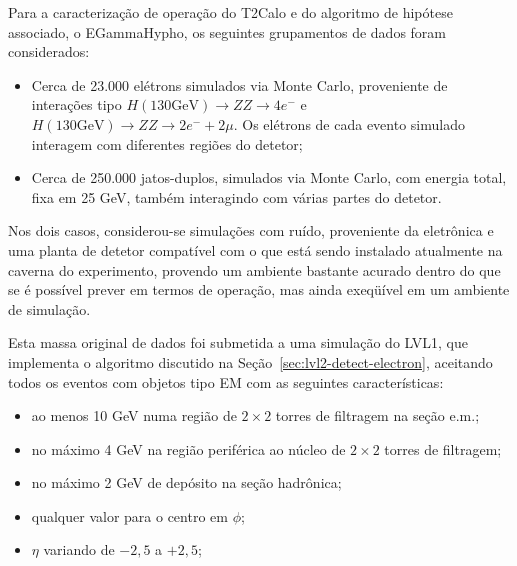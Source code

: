 Para a caracterização de operação do T2Calo e do algoritmo de hipótese
associado, o EGammaHypho, os seguintes grupamentos de dados foram
considerados:

\begin{itemize}
\item Cerca de 23.000 elétrons simulados via Monte Carlo, proveniente de
interações tipo $H (130 \text{GeV})\rightarrow ZZ \rightarrow 4e^-$ e 
$H (130 \text{GeV})\rightarrow ZZ \rightarrow 2e^- + 2\mu$. Os elétrons de
cada evento simulado interagem com diferentes regiões do detetor;
\item Cerca de 250.000 jatos-duplos, simulados via Monte Carlo, com energia total,
fixa em 25 GeV, também interagindo com várias partes do detetor.
\end{itemize}

Nos dois casos, considerou-se simulações com ruído, proveniente da eletrônica
e uma planta de detetor compatível com o que está sendo instalado atualmente
na caverna do experimento, provendo um ambiente bastante acurado dentro do que
se é possível prever em termos de operação, mas ainda exeqüível em um ambiente
de simulação.

Esta massa original de dados foi submetida a uma simulação do LVL1, que
implementa o algoritmo discutido na Seção~\ref{sec:lvl2-detect-electron},
aceitando todos os eventos com objetos tipo EM com as seguintes
características:

\begin{itemize}
\item ao menos 10 GeV numa região de $2\times2$ torres de filtragem na seção
e.m.;
\item no máximo 4 GeV na região periférica ao núcleo de $2\times2$ torres de
filtragem; 
\item no máximo 2 GeV de depósito na seção hadrônica;
\item qualquer valor para o centro em $\phi$;
\item $\eta$ variando de $-2,5$ a $+2,5$;
\end{itemize}

